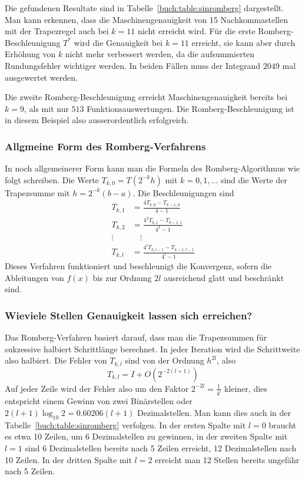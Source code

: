 Die gefundenen Resultate sind in Tabelle~\ref{buch:table:sinromberg}
dargestellt.
Man kann erkennen, dass die Maschinengenauigkeit von 15 Nachkommastellen
mit der Trapezregel auch bei $k=11$  nicht erreicht wird.
Für die erste Romberg-Beschleunigung $T^*$ wird die Genauigkeit
bei $k=11$ erreicht, sie kann aber durch Erhöhung von $k$ nicht
mehr verbessert werden, da die aufsummierten Rundungsfehler
wichtiger werden.
In beiden Fällen muss der Integrand $2049$ mal ausgewertet werden.

Die zweite Romberg-Beschleunigung erreicht Maschinengenauigkeit bereits bei
$k=9$, als mit nur $513$ Funktionsauswertungen.
Die Romberg-Beschleunigung ist in diesem Beispiel also ausserordentlich
erfolgreich.

\subsubsection{Allgmeine Form des Romberg-Verfahrens}
In noch allgemeinerer Form kann man die Formeln des Romberg-Algorithmus
wie folgt schreiben.
Die Werte 
$T_{k,0} = T(2^{-k}h)$ mit $k=0,1,\dots$
sind die Werte der Trapezsumme mit $h=2^{-k}(b-a)$.
Die Beschleunigungen sind
\begin{align*}
T_{k,1} &= \frac{4T_{k,0}-T_{k-1,0}}{4-1} \\
T_{k,2} &= \frac{4^2T_{k,1}-T_{k-1,1}}{4^2-1}\\
\vdots\;&\quad \vdots\\
T_{k,l} &= \frac{4^lT_{k,l-1}-T_{k-1,l-1}}{4^l-1}
\end{align*}
Dieses Verfahren funktioniert und beschleunigt die Konvergenz,
sofern die Ableitungen von $f(x)$ bis zur Ordnung $2l$ ausreichend glatt
und beschränkt sind.

\subsubsection{Wieviele Stellen Genauigkeit lassen sich erreichen?}
Das Romberg-Verfahren basiert darauf, dass man die Trapezsummen 
für sukzessive halbiert Schrittlänge berechnet.
In jeder Iteration wird die Schrittweite also halbiert.
Die Fehler von $T_{k,l}$ sind von der Ordnung $h^{2l}$, also
\[
T_{k,l} = I + O(2^{-2(l+1)})
\]
Auf jeder Zeile wird der Fehler also um den Faktor
$2^{-2l}=\frac1{4^l}$ kleiner,
dies entspricht einem Gewinn von zwei Binärstellen oder 
$2(l+1)\log_{10}2=0.60206(l+1)$ Dezimalstellen.
Man kann dies auch in der Tabelle~\ref{buch:table:sinromberg}
verfolgen.
In der ersten Spalte mit $l=0$ braucht es etwa 10 Zeilen, um 6 Dezimalstellen
zu gewinnen, in der zweiten Spalte mit $l=1$ sind 6 Dezimalstellen
bereits nach 5 Zeilen erreicht, 12 Dezimalstellen nach 10 Zeilen.
In der dritten Spalte mit $l=2$ erreicht man 12 Stellen bereits ungefähr
nach 5 Zeilen.



